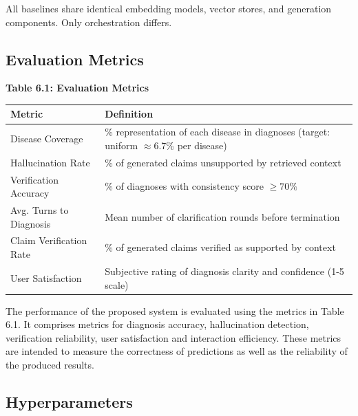 \documentclass[conference]{IEEEtran}
\begin{document}
All baselines share identical embedding models, vector stores, and generation components. Only orchestration differs.

\subsection{Evaluation Metrics}

\begin{table}[H]
\centering
\textbf{Table 6.1: Evaluation Metrics}\\[2pt]
\begin{tabular}{|p{2.5cm}|p{4.6cm}|}
\hline
\textbf{Metric} & \textbf{Definition} \\
\hline
Disease Coverage & \% representation of each disease in diagnoses (target: uniform $\approx$6.7\% per disease) \\
\hline
Hallucination Rate & \% of generated claims unsupported by retrieved context \\
\hline
Verification Accuracy & \% of diagnoses with consistency score $\geq 70\%$ \\
\hline
Avg. Turns to Diagnosis & Mean number of clarification rounds before termination \\
\hline
Claim Verification Rate & \% of generated claims verified as supported by context \\
\hline
User Satisfaction & Subjective rating of diagnosis clarity and confidence (1-5 scale) \\
\hline
\end{tabular}
\par\medskip
\noindent The performance of the proposed system is evaluated using the metrics in Table 6.1. It comprises metrics for diagnosis accuracy, hallucination detection, verification reliability, user satisfaction and interaction efficiency. These metrics are intended to measure the correctness of predictions as well as the reliability of the produced results.
\label{tab1}
\end{table}

\subsection{Hyperparameters}
\end{document}
